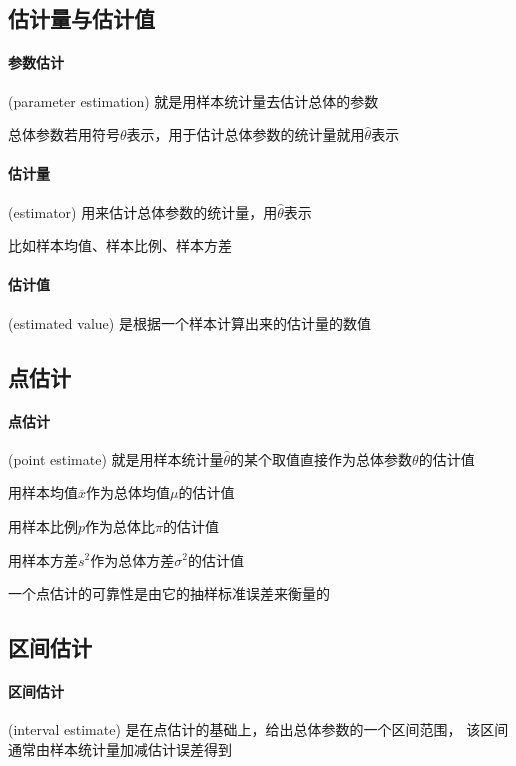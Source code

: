 \documentclass[UTF8,10pt]{book}
\begin{document}
        \subsection{估计量与估计值}

            \paragraph{参数估计} (parameter estimation) 就是用样本统计量去估计总体的参数

            {\kaishu 总体参数若用符号$\theta$表示，用于估计总体参数的统计量就用$\hat{\theta}$表示}

            \paragraph{估计量} (estimator) 用来估计总体参数的统计量，用$\hat{\theta}$表示

            {\kaishu 比如样本均值、样本比例、样本方差}

            \paragraph{估计值} (estimated value) 是根据一个样本计算出来的估计量的数值

        \subsection{点估计}

            \paragraph{点估计} (point estimate) 就是用样本统计量$\hat{\theta}$的某个取值直接作为总体参数$\theta$的估计值

            {\kaishu
            用样本均值$\overline{x}$作为总体均值$\mu$的估计值

            用样本比例$p$作为总体比$\pi$的估计值

            用样本方差$s^2$作为总体方差$\sigma^2$的估计值}

            一个点估计的{\kaishu 可靠性}是由它的{\kaishu 抽样标准误差}来衡量的
            

        \subsection{区间估计}

            \paragraph{区间估计} (interval estimate) 是在{\kaishu 点估计}的基础上，给出总体参数的一个区间范围，
            该区间通常由{\kaishu 样本统计量}加减{\kaishu 估计误差}得到
\end{document}
